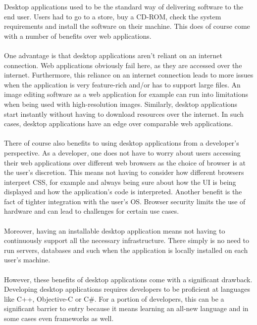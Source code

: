 Desktop applications used to be the standard way of delivering software to the end user.
Users had to go to a store, buy a CD-ROM, check the system requirements and install the software 
on their machine.
This does of course come with a number of benefits over web applications.\paragraph{}
One advantage is that desktop applications aren't reliant on an internet connection.
Web applications obviously fail here, as they are accessed over the internet.
Furthermore, this reliance on an internet connection leads to more issues when the application
is very feature-rich and/or has to support large files.
An image editing software as a web application for example can run into limitations when being
used with high-resolution images. 
Similarly, desktop applications start instantly without having to download resources over the 
internet. 
In such cases, desktop applications have an edge over comparable web applications. \parencite{jensen2017}\paragraph{}
There of course also benefits to using desktop applications from a developer's perspective.
As a developer, one does not have to worry about users accessing their web applications over different web browsers 
as the choice of browser is at the user's discretion. 
This means not having to consider how different browsers interpret CSS, for example and always being sure about how the UI 
is being displayed and how the application's code is interpreted.
Another benefit is the fact of tighter integration with the user's OS.
Browser security limits the use of hardware and can lead to challenges for certain use cases. \parencite{jensen2017}\paragraph{}
Moreover, having an installable desktop application means not having to continuously support all the necessary infrastructure.
There simply is no need to run servers, databases and such when the application is locally installed on each user's machine. \parencite{jensen2017}\paragraph{}
However, these benefits of desktop applications come with a significant drawback.
Developing desktop applications requires developers to be proficient at languages like C++, Objective-C or C\#. 
For a portion of developers, this can be a significant barrier to entry because it means learning an all-new language and in some cases even frameworks as well.
